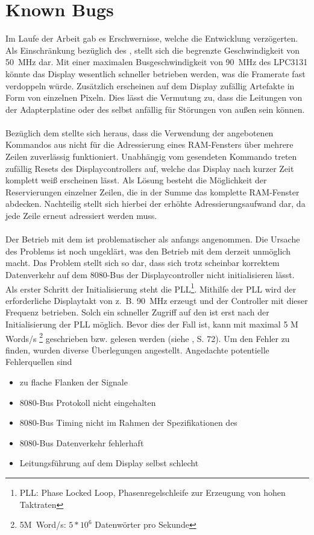 \section{Known Bugs}
\label{teila_knownbugs}
Im Laufe der Arbeit gab es Erschwernisse, welche die Entwicklung verzögerten. 
Als Einschränkung bezüglich des , stellt sich die begrenzte Geschwindigkeit von 50~MHz dar. Mit einer maximalen Busgeschwindigkeit von 90~MHz des LPC3131 könnte das Display wesentlich schneller betrieben werden, was die Framerate fast verdoppeln würde. Zusätzlich erscheinen auf dem Display zufällig Artefakte in Form von einzelnen Pixeln. Dies lässt die Vermutung zu, dass die Leitungen von der Adapterplatine oder des  selbst anfällig für Störungen von außen sein können. \\ \\
Bezüglich dem  stellte sich heraus, dass die Verwendung der angebotenen Kommandos aus  nicht für die Adressierung eines RAM-Fensters über mehrere Zeilen zuverlässig funktioniert. Unabhängig vom gesendeten Kommando treten zufällig Resets des Displaycontrollers auf, welche das Display nach kurzer Zeit komplett weiß erscheinen lässt. Als Lösung besteht die Möglichkeit der Reservierungen einzelner Zeilen, die in der Summe das komplette RAM-Fenster abdecken. Nachteilig stellt sich hierbei der erhöhte Adressierungsaufwand dar, da jede Zeile erneut adressiert werden muss.\\ \\
Der Betrieb mit dem  ist problematischer als anfangs angenommen. Die Ursache des Problems ist noch ungeklärt, was den Betrieb mit dem  derzeit unmöglich macht.
Das Problem stellt sich so dar, dass sich trotz scheinbar korrektem Datenverkehr auf dem 8080-Bus der Displaycontroller nicht initialisieren lässt. Als erster Schritt der Initialisierung steht die PLL\footnote{PLL: Phase Locked Loop, Phasenregelschleife zur Erzeugung von hohen Taktraten}. Mithilfe der PLL wird der erforderliche Displaytakt von z.~B. 90~MHz erzeugt und der Controller mit dieser Frequenz betrieben. Solch ein schneller Zugriff auf den  ist erst nach der Initialisierung der PLL möglich. Bevor dies der Fall ist, kann mit maximal 5 M Words/s \footnote{5M~Word/s: $5*10^6$ Datenwörter pro Sekunde} geschrieben bzw. gelesen werden (siehe \cite{SSD2008}, S. 72). Um den Fehler zu finden, wurden diverse Überlegungen angestellt. Angedachte potentielle Fehlerquellen sind
\begin{itemize}
\item zu flache Flanken der Signale
\item 8080-Bus Protokoll nicht eingehalten
\item 8080-Bus Timing nicht im Rahmen der Spezifikationen des 
\item 8080-Bus Datenverkehr fehlerhaft
\item Leitungsführung auf dem Display selbst schlecht
\end{itemize}
